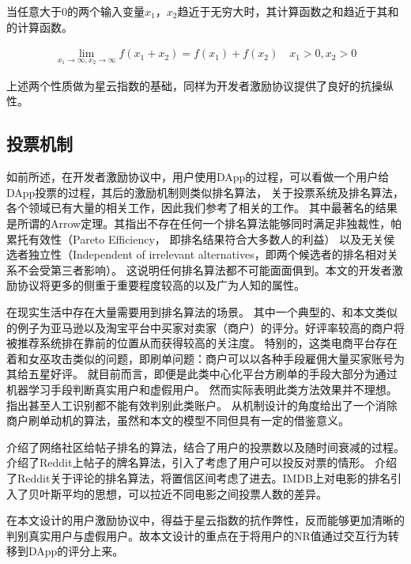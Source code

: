 \begin{property}
\label{prop:two}
当任意大于$0$的两个输入变量$x_1$，$x_2$趋近于无穷大时，其计算函数之和趋近于其和的计算函数。
\end{property}
\begin{align}
\lim\limits_{x_1 \to \infty, x_2\to \infty} f(x_1+x_2) = f(x_1) + f(x_2)\quad x_1>0, x_2>0
\end{align}

\noindent 上述两个性质做为星云指数的基础，同样为开发者激励协议提供了良好的抗操纵性。

\subsection{投票机制}
如前所述，在开发者激励协议中，用户使用DApp的过程，可以看做一个用户给DApp投票的过程，其后的激励机制则类似排名算法，
关于投票系统及排名算法，各个领域已有大量的相关工作，因此我们参考了相关的工作。
其中最著名的结果是所谓的Arrow定理\cite{arrow1951extension}。其指出不存在任何一个排名算法能够同时满足非独裁性，帕累托有效性（Pareto Efficiency， 即排名结果符合大多数人的利益）
以及无关侯选者独立性（Independent of irrelevant alternatives，即两个候选者的排名相对关系不会受第三者影响）。
这说明任何排名算法都不可能面面俱到。本文的开发者激励协议将更多的侧重于重要程度较高的以及广为人知的属性。

在现实生活中存在大量需要用到排名算法的场景。
其中一个典型的、和本文类似的例子为亚马逊以及淘宝平台中买家对卖家（商户）的评分。好评率较高的商户将被推荐系统排在靠前的位置从而获得较高的关注度。
特别的，这类电商平台存在着和女巫攻击类似的问题，即刷单问题：商户可以以各种手段雇佣大量买家账号为其给五星好评。
就目前而言，即便是此类中心化平台方刷单的手段大部分为通过机器学习手段判断真实用户和虚假用户\cite{mukherjee2013spotting,jindal2008opinion,yoo2009comparison}。
然而实际表明此类方法效果并不理想。\cite{ott2011finding}指出甚至人工识别都不能有效判别此类账户。
\cite{cai2016mechanism}从机制设计的角度给出了一个消除商户刷单动机的算法，虽然和本文的模型不同但具有一定的借鉴意义。


\cite{salihefendic2010hacker}介绍了网络社区给帖子排名的算法，结合了用户的投票数以及随时间衰减的过程。
\cite{salihefendic2010reddit}介绍了Reddit上帖子的牌名算法，引入了考虑了用户可以投反对票的情形。
\cite{miller2009how}介绍了Reddit关于评论的排名算法，将置信区间考虑了进去。IMDB\cite{IMDB}上对电影的排名引入了贝叶斯平均的思想，可以拉近不同电影之间投票人数的差异。

在本文设计的用户激励协议中，得益于星云指数的抗作弊性，反而能够更加清晰的判别真实用户与虚假用户。故本文设计的重点在于将用户的NR值通过交互行为转移到DApp的评分上来。



